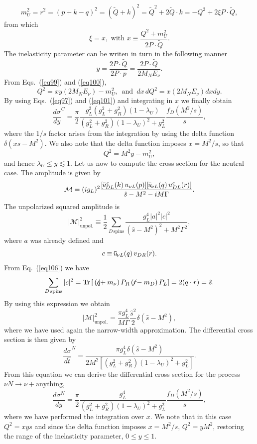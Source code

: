 \documentclass[aps,preprint,tightenlines,floatfix,superscriptaddress,nofootinbib,showpacs]{revtex4-1}
\def\beq{\begin{equation}}
\def\eeq{\end{equation}}
\def\qslash{q\hspace{-10pt}\not{}\hspace{2pt}}
\def\rslash{r\hspace{-10pt}\not{}\hspace{2pt}}
\newcommand*\xbar[1]{%
  \hbox{%
    \vbox{%
      \hrule height 0.5pt %
      \kern0.3ex%
      \hbox{%
        \kern-0.1em%
        \ensuremath{#1}%
        \kern-0.1em%
      }%
    }%
  }%
}
\begin{document}
\beq
\label{eq98}
m^2_U = r^2 = (p+k-q)^2=(\tilde{Q}+k)^2=\tilde{Q}^2+2\tilde{Q}\cdot k = -Q^2 +2\xi P\cdot\tilde{Q},
\eeq
from which
\beq
\label{eq99}
\xi=x, \mbox{ with } x \equiv \frac{Q^2+m^2_U}{2 P\cdot \tilde{Q}}.
\eeq
The inelasticity parameter can be writen in turn in the following manner
\beq
\label{eq100}
y=\frac{2 P\cdot \tilde{Q}}{2P\cdot p}=\frac{2P\cdot \tilde{Q}}{2M_N E_{\nu}}.
\eeq
From Eqs.~(\ref{eq99}) and (\ref{eq100}),
\beq
\label{eq101}
Q^2=xy(2M_N E_{\nu})-m^2_U, \,\mbox{ and }\, dx\,dQ^2 = x(2M_N E_{\nu}) dx dy.
\eeq
By using Eqs.~(\ref{eq97}) and (\ref{eq101}) and integrating in $x$ we finally obtain
\beq
\label{eq102}
\frac{d\sigma}{dy}^C =\frac{\pi}{2}\frac{g^2_L(g^2_L+g^2_R)(1-\lambda_U)}{(g^2_L+g^2_R)(1-\lambda_U)^2+g^2_L}\frac{f_D(M^2/s)}{s},
\eeq
where the $1/s$ factor arises from the integration by using the delta function $\delta (xs-M^2)$. We also note that the delta function imposes $x=M^2/s$, so that
\beq
\label{eq103}
Q^2 = M^2 y -m^2_U,
\eeq
and hence $\lambda_U \leqslant y \lesssim 1 $. 
Let us now to compute the cross section for the neutral case. The amplitude is given by
\beq
\label{eq104}
\mathcal{M}= (ig_L)^2 \frac{[\xbar{u}^{\,c}_{DL}(k)\,u_{\nu L}(p)][\xbar{u}_{\nu L}(q)\,u^c_{DL}(r)]}{\hat{s}-M^2-iM\Gamma}.
\eeq 
The unpolarized squared amplitude is
\beq
\label{eq105}
|\mathcal{M}|^2_{\mathrm{unpol.}}\equiv \frac{1}{2}\sum_{D\,\mathrm{spins}}\frac{g^4_L |a|^2|c|^2}{(\hat{s}-M^2)^2+M^2\Gamma^2},
\eeq
where $a$ was already defined and
\beq
\label{eq106}
c\equiv \xbar{u}_{\nu L}(q)\,v_{DR}(r).
\eeq
From Eq.~(\ref{eq106}) we have
\beq
\label{eq107}
\sum_{D \,\mathrm{spins}}|c|^2= \mathrm{Tr}\,[\,(\qslash + m_{\nu})\,P_R\,(\rslash - m_D)\,P_L]=2(q\cdot r)=\hat{s}.
\eeq
By using this expression we obtain
\beq
\label{eq108}
|\mathcal{M}|^2_{\mathrm{unpol.}}=\frac{\pi g^4_L}{M\Gamma} \frac{\hat{s}^2}{2}\delta (\hat{s}-M^2),
\eeq
where we have used again the narrow-width approximation. The differential cross section is then given by
\beq
\label{eq109}
\frac{d\sigma}{d\hat{t}}^N =\frac{\pi g^4_L \delta (\hat{s}-M^2)}{2M^2[(g^2_L+g^2_R)(1-\lambda_U)^2+g^2_L]}.
\eeq
From this equation we can derive the differential cross section for the process $\nu N \to \nu + \mbox{anything}$,
\beq
\label{eq110}
\frac{d\sigma^N}{dy}=\frac{\pi}{2}\frac{g^4_L}{(g^2_L+g^2_R)(1-\lambda_U)^2+g^2_L}\frac{f_D(M^2/s)}{s},
\eeq
where we have performed the integration over $x$. We note that in this case $Q^2=xys$ and since the delta function imposes $x=M^2/s$, $Q^2=yM^2$, restoring the range of the inelasticity parameter, $0\leqslant y \leqslant 1$.
\end{document}
